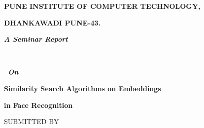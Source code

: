 \documentclass[12pt]{article}
\renewcommand{\_}{\kern-1.5pt\textunderscore\kern-1.5pt}
\begin{document}
\vspace{\baselineskip}
\begin{Center}
{\fontsize{14pt}{16.8pt}\selectfont \textbf{PUNE INSTITUTE OF COMPUTER TECHNOLOGY,}\par}
\end{Center}\par

\begin{Center}
{\fontsize{14pt}{16.8pt}\selectfont \textbf{DHANKAWADI PUNE-43.}\par}
\end{Center}\par

\begin{Center}
{\fontsize{26pt}{31.2pt}\selectfont \textbf{\textit{A Seminar Report}}\par}
\end{Center}\par

\begin{Center}
\textbf{\textit{ }\ \ \ \  }{\fontsize{24pt}{28.8pt}\selectfont \textbf{\textit{\ On  }\  }\par}
\end{Center}\par

\begin{Center}
{\fontsize{16pt}{19.2pt}\selectfont \textbf{ Similarity Search Algorithms on Embeddings }\par}
\end{Center}\par

\begin{Center}
{\fontsize{16pt}{19.2pt}\selectfont \textbf{in Face Recognition}\par}
\end{Center}\par

\begin{Center}
{\fontsize{14pt}{16.8pt}\selectfont  \par}
\end{Center}\par

\begin{Center}
{\fontsize{14pt}{16.8pt}\selectfont SUBMITTED BY\par}
\end{Center}\par

\begin{Center}
{\fontsize{14pt}{16.8pt}\selectfont  \par}
\end{Center}\par
\end{document}
